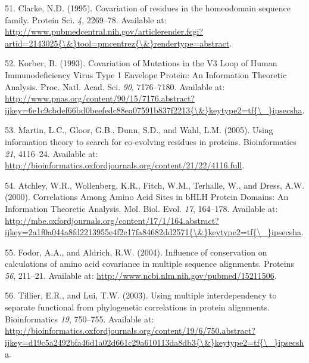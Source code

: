 \documentclass[11pt,a4paper,twoside]{book}
\theoremstyle{definition}
\theoremstyle{definition}
\theoremstyle{remark}
\begin{document}
\hypertarget{ref-Clarke1995}{}
51. Clarke, N.D. (1995). Covariation of residues in the homeodomain
sequence family. Protein Sci. \emph{4}, 2269--78. Available at:
\href{http://www.pubmedcentral.nih.gov/articlerender.fcgi?artid=2143025\%7B/\&\%7Dtool=pmcentrez\%7B/\&\%7Drendertype=abstract}{http://www.pubmedcentral.nih.gov/articlerender.fcgi?artid=2143025\{\textbackslash{}\&\}tool=pmcentrez\{\textbackslash{}\&\}rendertype=abstract}.

\hypertarget{ref-Korber1993}{}
52. Korber, B. (1993). Covariation of Mutations in the V3 Loop of Human
Immunodeficiency Virus Type 1 Envelope Protein: An Information Theoretic
Analysis. Proc. Natl. Acad. Sci. \emph{90}, 7176--7180. Available at:
\href{http://www.pnas.org/content/90/15/7176.abstract?ijkey=6e1c9cbdef66bd0beefedc88ea07591b837f2213\%7B/\&\%7Dkeytype2=tf\%7B/_\%7Dipsecsha}{http://www.pnas.org/content/90/15/7176.abstract?ijkey=6e1c9cbdef66bd0beefedc88ea07591b837f2213\{\textbackslash{}\&\}keytype2=tf\{\textbackslash{}\_\}ipsecsha}.

\hypertarget{ref-Martin2005}{}
53. Martin, L.C., Gloor, G.B., Dunn, S.D., and Wahl, L.M. (2005). Using
information theory to search for co-evolving residues in proteins.
Bioinformatics \emph{21}, 4116--24. Available at:
\url{http://bioinformatics.oxfordjournals.org/content/21/22/4116.full}.

\hypertarget{ref-Atchley2000}{}
54. Atchley, W.R., Wollenberg, K.R., Fitch, W.M., Terhalle, W., and
Dress, A.W. (2000). Correlations Among Amino Acid Sites in bHLH Protein
Domains: An Information Theoretic Analysis. Mol. Biol. Evol. \emph{17},
164--178. Available at:
\href{http://mbe.oxfordjournals.org/content/17/1/164.abstract?ijkey=2a1f0a044a8fd2213955e4f2c17fa84682dd2571\%7B/\&\%7Dkeytype2=tf\%7B/_\%7Dipsecsha}{http://mbe.oxfordjournals.org/content/17/1/164.abstract?ijkey=2a1f0a044a8fd2213955e4f2c17fa84682dd2571\{\textbackslash{}\&\}keytype2=tf\{\textbackslash{}\_\}ipsecsha}.

\hypertarget{ref-Fodor2004}{}
55. Fodor, A.A., and Aldrich, R.W. (2004). Influence of conservation on
calculations of amino acid covariance in multiple sequence alignments.
Proteins \emph{56}, 211--21. Available at:
\url{http://www.ncbi.nlm.nih.gov/pubmed/15211506}.

\hypertarget{ref-Tillier2003}{}
56. Tillier, E.R., and Lui, T.W. (2003). Using multiple interdependency
to separate functional from phylogenetic correlations in protein
alignments. Bioinformatics \emph{19}, 750--755. Available at:
\href{http://bioinformatics.oxfordjournals.org/content/19/6/750.abstract?ijkey=d19c5a2492bfa46d1a02d661c29a610113da8db3\%7B/\&\%7Dkeytype2=tf\%7B/_\%7Dipsecsha}{http://bioinformatics.oxfordjournals.org/content/19/6/750.abstract?ijkey=d19c5a2492bfa46d1a02d661c29a610113da8db3\{\textbackslash{}\&\}keytype2=tf\{\textbackslash{}\_\}ipsecsha}.
\end{document}
